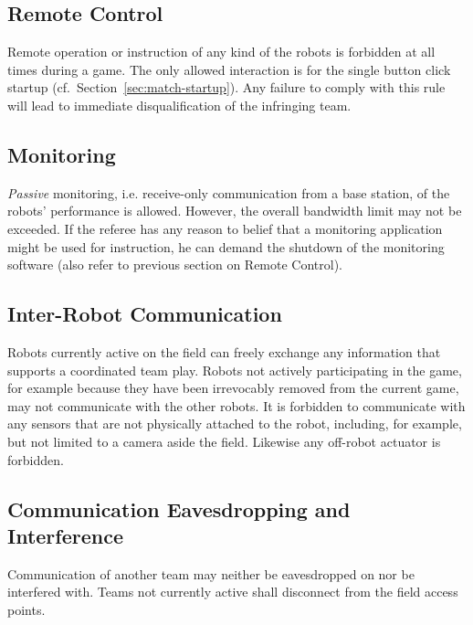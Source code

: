 \documentclass[12pt,twoside]{article}
\newcommand{\refsec}[1]{Section~\ref{#1}}
\begin{document}
\subsection{Remote Control}
\label{sec:remote-control}
Remote operation or instruction of any kind of the robots is forbidden
at all times during a game. The only allowed interaction is for the
single button click startup (cf.~\refsec{sec:match-startup}). Any
failure to comply with this rule will lead to immediate
disqualification of the infringing team.

\subsection{Monitoring}
\label{sec:monitoring}
\emph{Passive} monitoring, i.e. receive-only communication from a base
station, of the robots' performance is allowed. However, the overall
bandwidth limit may not be exceeded.
If the referee has any reason to belief that a monitoring application
might be used for instruction, he can demand the shutdown of the
monitoring software (also refer to previous section on Remote
Control).

\subsection{Inter-Robot Communication}
\label{sec:inter-robot-comm}
Robots currently active on the field can freely exchange any
information that supports a coordinated team play. Robots not actively
participating in the game, for example because they have been
irrevocably removed from the current game, may not communicate with
the other robots. It is forbidden to communicate with any sensors that
are not physically attached to the robot, including, for example, but
not limited to a camera aside the field. Likewise any off-robot
actuator is forbidden.

\subsection{Communication Eavesdropping and Interference}
\label{sec:comm-tampering}
Communication of another team may neither be eavesdropped on nor be
interfered with. Teams not currently active shall disconnect from the
field access points.
\end{document}
